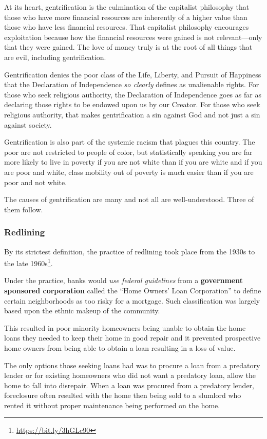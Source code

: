 At its heart, gentrification is the culmination of the capitalist philosophy that those who have more financial resources are inherently of a higher value than those who have less financial resources. That capitalist philosophy encourages exploitation because how the financial resources were gained is not relevant---only that they were gained. The love of money truly is at the root of all things that are evil, including gentrification.

Gentrification denies the poor class of the Life, Liberty, and Pursuit of Happiness that the Declaration of Independence \emph{so clearly} defines as unalienable rights. For those who seek religious authority, the Declaration of Independence goes as far as declaring those rights to be endowed upon us by our Creator. For those who seek religious authority, that makes gentrification a sin against God and not just a sin against society.

Gentrification is also part of the systemic racism that plagues this country. The poor are not restricted to people of color, but statistically speaking you are far more likely to live in poverty if you are not white than if you are white and if you are poor and white, class mobility out of poverty is much easier than if you are poor and not white.

The causes of gentrification are many and not all are well-understood. Three of them follow.

\subsubsection{Redlining}

By its strictest definition, the practice of redlining took place from the 1930s to the late 1960s\footnote{\url{https://bit.ly/3hGLc90}}.

Under the practice, banks would \emph{use federal guidelines} from a \textbf{government sponsored corporation} called the ``Home Owners' Loan Corporation'' to define certain neighborhoods as too risky for a mortgage. Such classification was largely based upon the ethnic makeup of the community.

This resulted in poor minority homeowners being unable to obtain the home loans they needed to keep their home in good repair and it prevented prospective home owners from being able to obtain a loan resulting in a loss of value.

The only options those seeking loans had was to procure a loan from a predatory lender or for existing homeowners who did not want a predatory loan, allow the home to fall into disrepair. When a loan was procured from a predatory lender, foreclosure often resulted with the home then being sold to a slumlord who rented it without proper maintenance being performed on the home.

